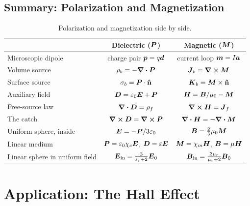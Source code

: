 \subsection{Summary: Polarization and Magnetization}

\begin{table}[ht]
\centering
\renewcommand{\arraystretch}{1.5}
\begin{tabular}{l|c|c}
    & Dielectric ($\vect{P}$) & Magnetic ($\vect{M}$)\\\hline
    Microscopic dipole & charge pair $\bm{p} = q\bm{d}$ & current loop $\bm{m} = I\bm{a}$\\
    Volume source & $\rho_b = -\div\vect{P}$ & $\vect{J}_b = \curl\vect{M}$\\
    Surface source & $\sigma_b = \vect{P}\cdot\uvect{n}$ & $\vect{K}_b = \vect{M}\times\uvect{n}$\\
    Auxiliary field & $\vect{D} = \varepsilon_0\vect{E} + \vect{P}$ & $\vect{H} = \vect{B}/\mu_0 - \vect{M}$\\
    Free-source law & $\div\vect{D} = \rho_f$ & $\curl\vect{H} = \vect{J}_f$\\
    The catch & $\curl\vect{D} = \curl\vect{P}$ & $\div\vect{H} = -\div\vect{M}$\\
    Uniform sphere, inside & $\vect{E} = -\vect{P}/3\varepsilon_0$ & $\vect{B} = \frac23\mu_0\vect{M}$\\
    Linear medium & $\vect{P} = \varepsilon_0\chi_e\vect{E}$, $\vect{D} = \varepsilon\vect{E}$ & $\vect{M} = \chi_m\vect{H}$, $\vect{B} = \mu\vect{H}$\\
    Linear sphere in uniform field & $\vect{E}_{\text{in}} = \frac{3}{\varepsilon_r+2}\vect{E}_0$ & $\vect{B}_{\text{in}} = \frac{3\mu_r}{\mu_r+2}\vect{B}_0$
\end{tabular}
\caption{Polarization and magnetization side by side.}
\end{table}

\section{Application: The Hall Effect}


